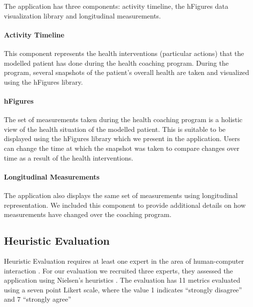\documentclass[twocolumn]{bmcart}%
\begin{document}
The application has three components: activity timeline, the hFigures data visualization library and longitudinal measurements.

\paragraph*{Activity Timeline} This component represents the health interventions (particular actions) that the modelled patient has done during the health coaching program. During the program, several snapshots of the patient's overall health are taken and visualized using the hFigures library.

\paragraph*{hFigures} The set of measurements taken during the health coaching program is a holistic view of the health situation of the modelled patient. This is suitable to be displayed using the hFigures library which we present in the application. Users can change the time at which the snapshot was taken to compare changes over time as a result of the health interventions.

\paragraph*{Longitudinal Measurements} The application also displays the same set of measurements using longitudinal representation. We included this component to provide additional details on how measurements have changed over the coaching program.

\subsection*{Heuristic Evaluation}

Heuristic Evaluation requires at least one expert in the area of human-computer interaction \cite{nielsen1994usability, johnson2011ehr}. For our evaluation we recruited three experts, they assessed the application using Nielsen's heuristics \cite{nielsen1994usability}. The evaluation has 11 metrics evaluated using a seven point Likert scale, where the value 1 indicates ``strongly disagree'' and 7 ``strongly agree''

\end{document}
